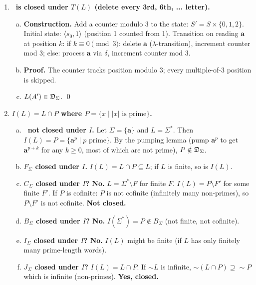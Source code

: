 \begin{enumerate}[{5.}1. ]
\item \textbf{\DSIG\ is closed under $T(L)$ (delete every 3rd, 6th, ... letter).}

\begin{enumerate}[(a)]
  \item \textbf{Construction.}  Add a counter modulo 3 to the state: $S'=S\times\{0,1,2\}$.  Initial state: $\langle s_0,1\rangle$ (position 1 counted from 1).  Transition on reading $\pmb{a}$ at position $k$:
  if $k\equiv 0\pmod{3}$: delete $\pmb{a}$ ($\lambda$-transition), increment counter mod 3;
  else: process $\pmb{a}$ via $\delta$, increment counter mod 3.

  \item \textbf{Proof.}  The counter tracks position modulo 3; every multiple-of-3 position is skipped.

  \item $L(A')\in\mathfrak{D}_\Sigma$. \qed
\end{enumerate}

\item \textbf{$I(L)=L\cap P$ where $P=\{x\mid|x|\text{ is prime}\}$.}

\begin{enumerate}[(a)]
  \item \textbf{\DSIG\ not closed under $I$.}  Let $\Sigma=\{\pmb{a}\}$ and $L=\Sigma^*$.  Then $I(L)=P=\{\pmb{a}^p\mid p\text{ prime}\}$.  By the pumping lemma (pump $\pmb{a}^p$ to get $\pmb{a}^{p+k}$ for any $k\ge 0$, most of which are not prime), $P\notin\mathfrak{D}_\Sigma$.

  \item \textbf{$F_\Sigma$ closed under $I$.}  $I(L)=L\cap P\subseteq L$; if $L$ is finite, so is $I(L)$.

  \item \textbf{$C_\Sigma$ closed under $I$? No.}  $L=\Sigma^*\setminus F$ for finite $F$.  $I(L)=P\setminus F'$ for some finite $F'$.  If $P$ is cofinite: $P$ is not cofinite (infinitely many non-primes), so $P\setminus F'$ is not cofinite.  \textbf{Not closed.}

  \item \textbf{$B_\Sigma$ closed under $I$? No.}  $I(\Sigma^*)=P\notin B_\Sigma$ (not finite, not cofinite).

  \item \textbf{$I_\Sigma$ closed under $I$? No.}  $I(L)$ might be finite (if $L$ has only finitely many prime-length words).

  \item \textbf{$J_\Sigma$ closed under $I$?}  $I(L)=L\cap P$.  If $\sim L$ is infinite, $\sim(L\cap P)\supseteq\sim P$ which is infinite (non-primes).  \textbf{Yes, closed.}


\end{enumerate}
\end{enumerate}
